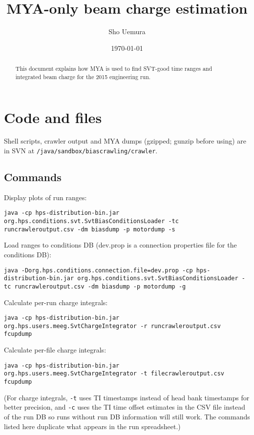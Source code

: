 \documentclass[aps,amsmath,amssymb,notitlepage,11pt,onecolumn]{revtex4-1}
\begin{document}

\title{MYA-only beam charge estimation}
\author{Sho Uemura}
\date{\today}
\begin{abstract}
    This document explains how MYA is used to find SVT-good time ranges and integrated beam charge for the 2015 engineering run.
\end{abstract}
\maketitle

\section{Code and files}

Shell scripts, crawler output and MYA dumps (gzipped; gunzip before using) are in SVN at \texttt{/java/sandbox/biascrawling/crawler}.

\subsection{Commands}
Display plots of run ranges:

\texttt{java -cp hps-distribution-bin.jar org.hps.conditions.svt.SvtBiasConditionsLoader -tc runcrawleroutput.csv -dm biasdump -p motordump -s}

Load ranges to conditions DB (dev.prop is a connection properties file for the conditions DB):

\texttt{java -Dorg.hps.conditions.connection.file=dev.prop -cp hps-distribution-bin.jar org.hps.conditions.svt.SvtBiasConditionsLoader -tc runcrawleroutput.csv -dm biasdump -p motordump -g}

Calculate per-run charge integrals:

\texttt{java -cp hps-distribution-bin.jar org.hps.users.meeg.SvtChargeIntegrator -r runcrawleroutput.csv fcupdump}

Calculate per-file charge integrals:

\texttt{java -cp hps-distribution-bin.jar org.hps.users.meeg.SvtChargeIntegrator -t filecrawleroutput.csv fcupdump}

(For charge integrals, \texttt{-t} uses TI timestamps instead of head bank timestamps for better precision, and \texttt{-c} uses the TI time offset estimates in the CSV file instead of the run DB so runs without run DB information will still work.
The commands listed here duplicate what appears in the run spreadsheet.)
\end{document}
